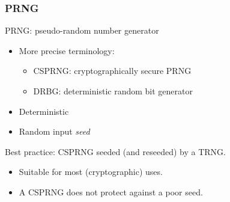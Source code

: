 
\begin{frame}
  \frametitle{PRNG}

  PRNG: pseudo-random number generator
  \begin{itemize}[<+(1)->]
    \item More precise terminology:
    \begin{itemize}
      \item CSPRNG: cryptographically secure PRNG
      \item DRBG: deterministic random bit generator
    \end{itemize}
    \item Deterministic
    \item Random input \emph{seed}
  \end{itemize}

  \vspace*{1em}

  \pause
  Best practice: CSPRNG seeded (and reseeded) by a TRNG.
  \begin{itemize}[<+(1)->]
    \item Suitable for most (cryptographic) uses.
    \item A CSPRNG does not protect against a poor seed.
  \end{itemize}
\end{frame}

